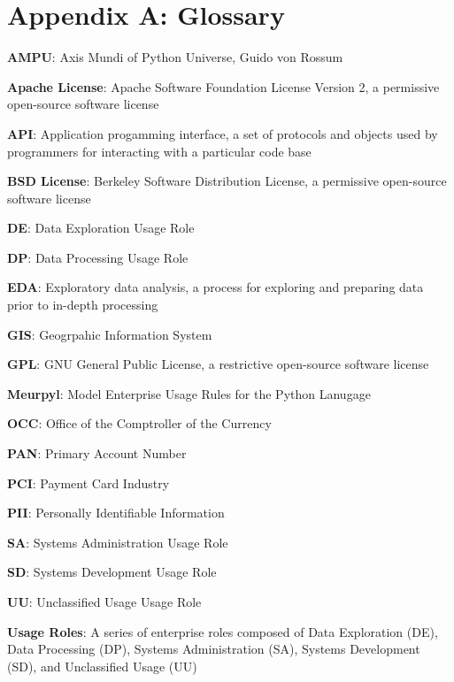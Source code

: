 \newcommand{\definition}[2]{
	\textbf{#1}: #2
}

\section{Appendix A: Glossary}

\thispagestyle{section_start_style}

	\definition{AMPU}{Axis Mundi of Python Universe, Guido von Rossum}

    \definition{Apache License}{Apache Software Foundation License Version 2, a permissive open-source software license}

    \definition{API}{Application progamming interface, a set of protocols and objects used by programmers for interacting with a particular code base}

    \definition{BSD License}{Berkeley Software Distribution License, a permissive open-source software license}

	\definition{DE}{Data Exploration Usage Role}

	\definition{DP}{Data Processing Usage Role}

	\definition{EDA}{Exploratory data analysis, a process for exploring and preparing data prior to in-depth processing}

	\definition{GIS}{Geogrpahic Information System}

    \definition{GPL}{GNU General Public License, a restrictive open-source software license}

	\definition{Meurpyl}{Model Enterprise Usage Rules for the Python Lanugage}

	\definition{OCC}{Office of the Comptroller of the Currency}

	\definition{PAN}{Primary Account Number}

	\definition{PCI}{Payment Card Industry}

	\definition{PII}{Personally Identifiable Information}

	\definition{SA}{Systems Administration Usage Role}

	\definition{SD}{Systems Development Usage Role}

	\definition{UU}{Unclassified Usage Usage Role}

	\definition{Usage Roles}{A series of enterprise roles composed of Data Exploration (DE), Data Processing (DP), Systems Administration (SA), Systems Development (SD), and Unclassified Usage (UU)}

\setlength{\parskip}{1em}
